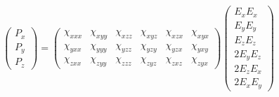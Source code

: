 \begin{equation}\label{eq:background:NonlinearOptics:permutation:PshgFull}
	\begin{pmatrix}
		P_{x}\\ 
		P_{y}\\ 
		P_{z}
	\end{pmatrix} =
	\begin{pmatrix}
		\chi_{xxx} & \chi_{xyy} & \chi_{xzz} & \chi_{xyz} & \chi_{xzx} & \chi_{xyx}\\ 
		\chi_{yxx} & \chi_{yyy} & \chi_{yzz} & \chi_{yzy} & \chi_{yzx} & \chi_{yxy}\\ 
		\chi_{zxx} & \chi_{zyy} & \chi_{zzz} & \chi_{zyz} & \chi_{zxz} & \chi_{zyx}
	\end{pmatrix}
	\begin{pmatrix}
		E_{x}E_{x}\\ 
		E_{y}E_{y}\\ 
		E_{z}E_{z}\\
		2E_{y}E_{z}\\ 
		2E_{z}E_{x}\\ 
		2E_{x}E_{y}
	\end{pmatrix}
\end{equation}

